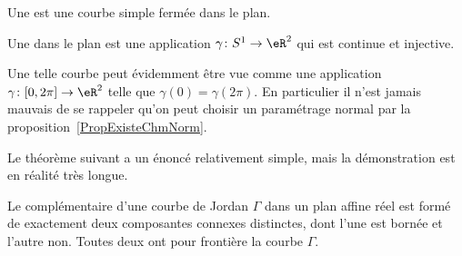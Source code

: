 \begin{definition}       \label{DEFooCJCWooLNrHFd}
	Une  est une courbe simple fermée dans le plan.
\end{definition}

\begin{definition}      \label{DEFooBYRDooTBgsui}
	Une  dans le plan est une application \( \gamma\colon S^1\to \eR^2\) qui est continue et injective.
\end{definition}
Une telle courbe peut évidemment être vue comme une application \( \gamma\colon \mathopen[ 0 , 2\pi ]\to \eR^2\) telle que \( \gamma(0)=\gamma(2\pi)\). En particulier il n'est jamais mauvais de se rappeler qu'on peut choisir un paramétrage normal par la proposition~\ref{PropExisteChmNorm}.

Le théorème suivant a un énoncé relativement simple, mais la démonstration est en réalité très longue.
\begin{theorem}\label{ThoHSPWBuh}
	Le complémentaire d'une courbe de Jordan \( \Gamma\) dans un plan affine réel est formé de exactement deux composantes connexes distinctes, dont l'une est bornée et l'autre non. Toutes deux ont pour frontière la courbe \( \Gamma\).
\end{theorem}
